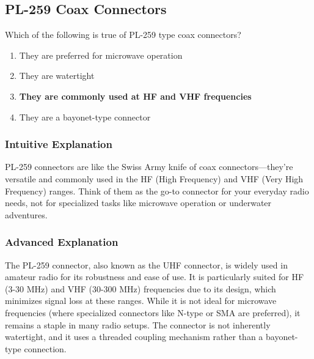 \subsection{PL-259 Coax Connectors}
\label{T9B07}

\begin{tcolorbox}[colback=gray!10!white,colframe=black!75!black,title=T9B07]
Which of the following is true of PL-259 type coax connectors?
\begin{enumerate}[noitemsep]
    \item They are preferred for microwave operation
    \item They are watertight
    \item \textbf{They are commonly used at HF and VHF frequencies}
    \item They are a bayonet-type connector
\end{enumerate}
\end{tcolorbox}

\subsubsection*{Intuitive Explanation}
PL-259 connectors are like the Swiss Army knife of coax connectors—they’re versatile and commonly used in the HF (High Frequency) and VHF (Very High Frequency) ranges. Think of them as the go-to connector for your everyday radio needs, not for specialized tasks like microwave operation or underwater adventures.

\subsubsection*{Advanced Explanation}
The PL-259 connector, also known as the UHF connector, is widely used in amateur radio for its robustness and ease of use. It is particularly suited for HF (3-30 MHz) and VHF (30-300 MHz) frequencies due to its design, which minimizes signal loss at these ranges. While it is not ideal for microwave frequencies (where specialized connectors like N-type or SMA are preferred), it remains a staple in many radio setups. The connector is not inherently watertight, and it uses a threaded coupling mechanism rather than a bayonet-type connection.